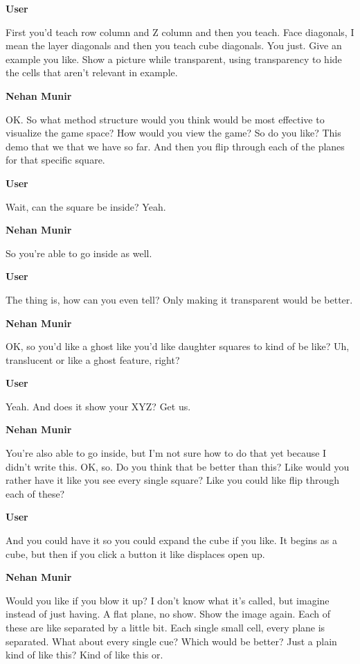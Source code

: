 \documentclass{article}
\begin{document}
\noindent \textbf{User}

First you'd teach row column and Z column and then you teach. Face diagonals, I mean the layer diagonals and then you teach cube diagonals. You just. Give an example you like. Show a picture while transparent, using transparency to hide the cells that aren't relevant in example.

\noindent \textbf{Nehan Munir}

OK. So what method structure would you think would be most effective to visualize the game space? How would you view the game? So do you like? This demo that we that we have so far. And then you flip through each of the planes for that specific square.

\noindent \textbf{User}

Wait, can the square be inside? Yeah.

\noindent \textbf{Nehan Munir}

So you're able to go inside as well.

\noindent \textbf{User}

The thing is, how can you even tell? Only making it transparent would be better.

\noindent \textbf{Nehan Munir}

OK, so you'd like a ghost like you'd like daughter squares to kind of be like? Uh, translucent or like a ghost feature, right?

\noindent \textbf{User}

Yeah. And does it show your XYZ? Get us.

\noindent \textbf{Nehan Munir}

You're also able to go inside, but I'm not sure how to do that yet because I didn't write this. OK, so. Do you think that be better than this? Like would you rather have it like you see every single square? Like you could like flip through each of these?

\noindent \textbf{User}

And you could have it so you could expand the cube if you like. It begins as a cube, but then if you click a button it like displaces open up.

\noindent \textbf{Nehan Munir}

Would you like if you blow it up? I don't know what it's called, but imagine instead of just having. A flat plane, no show. Show the image again. Each of these are like separated by a little bit. Each single small cell, every plane is separated. What about every single cue? Which would be better? Just a plain kind of like this? Kind of like this or.
\end{document}
